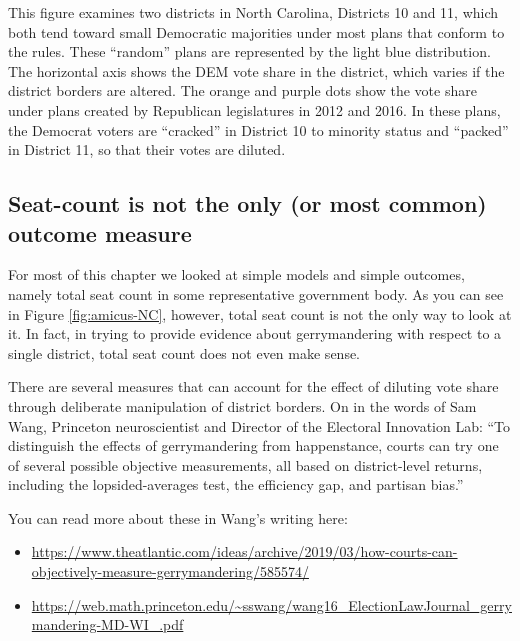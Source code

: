 \documentclass[
  openany]{book}
\providecommand{\tightlist}{%
  \setlength{\itemsep}{0pt}\setlength{\parskip}{0pt}}
\begin{document}
This figure examines two districts in North Carolina, Districts 10 and 11, which both tend toward small Democratic majorities under most plans that conform to the rules. These ``random'' plans are represented by the light blue distribution. The horizontal axis shows the DEM vote share in the district, which varies if the district borders are altered. The orange and purple dots show the vote share under plans created by Republican legislatures in 2012 and 2016. In these plans, the Democrat voters are ``cracked'' in District 10 to minority status and ``packed'' in District 11, so that their votes are diluted.

\hypertarget{seat-count-is-not-the-only-or-most-common-outcome-measure}{%
\subsection*{Seat-count is not the only (or most common) outcome measure}\label{seat-count-is-not-the-only-or-most-common-outcome-measure}}

For most of this chapter we looked at simple models and simple outcomes, namely total seat count in some representative government body. As you can see in Figure \ref{fig:amicus-NC}, however, total seat count is not the only way to look at it. In fact, in trying to provide evidence about gerrymandering with respect to a single district, total seat count does not even make sense.

There are several measures that can account for the effect of diluting vote share through deliberate manipulation of district borders. On in the words of Sam Wang, Princeton neuroscientist and Director of the Electoral Innovation Lab: ``To distinguish the effects of gerrymandering from happenstance, courts can try one of several possible objective measurements, all based on district-level returns, including the lopsided-averages test, the efficiency gap, and partisan bias.''

You can read more about these in Wang's writing here:

\begin{itemize}
\tightlist
\item
  \url{https://www.theatlantic.com/ideas/archive/2019/03/how-courts-can-objectively-measure-gerrymandering/585574/}
\item
  \url{https://web.math.princeton.edu/~sswang/wang16_ElectionLawJournal_gerrymandering-MD-WI_.pdf}
\end{itemize}
\end{document}
